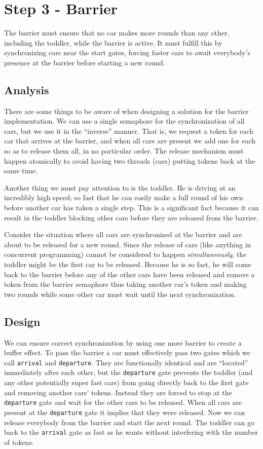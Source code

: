 \section{Step 3 - Barrier}

The barrier must ensure that no car makes more rounds than any other, including the toddler, while the barrier is active. It must fulfill this by synchronizing cars near the start gates, forcing faster cars to await everybody's presence at the barrier before starting a new round.

\subsection{Analysis}
There are some things to be aware of when designing a solution for the barrier implementation. We can use a single semaphore for the synchronization of all cars, but we use it in the ``inverse'' manner. That is, we request a token for each car that arrives at the barrier, and when all cars are present we add one for each so as to release them all, in no particular order. The release mechanism must happen atomically to avoid having two threads (cars) putting tokens back at the same time.

Another thing we must pay attention to is the toddler. He is driving at an incredibly high speed; so fast that he can easily make a full round of his own before another car has taken a single step. This is a significant fact because it can result in the toddler blocking other cars before they are released from the barrier.

Consider the situation where all cars are synchronized at the barrier and are about to be released for a new round. Since the release of cars (like anything in concurrent programming) cannot be considered to happen \emph{simultaneously}, the toddler might be the first car to be released. Because he is so fast, he will come back to the barrier before any of the other cars have been released and remove a token from the barrier semaphore thus taking another car's token and making two rounds while some other car must wait until the next synchronization.

\subsection{Design}
We can ensure correct synchronization by using one more barrier to create a buffer effect. To pass the barrier a car must effectively pass two gates which we call \texttt{arrival} and \texttt{departure}. They are functionally identical and are ``located'' immediately after each other, but the \texttt{departure} gate prevents the toddler (and any other potentially super fast cars) from going directly back to the first gate and removing another cars' tokens. Instead they are forced to stop at the \texttt{departure} gate and wait for the other cars to be released. When all cars are present at the \texttt{departure} gate it implies that they were released. Now we can release everybody from the barrier and start the next round. The toddler can go back to the \texttt{arrival} gate as fast as he wants without interfering with the number of tokens.

